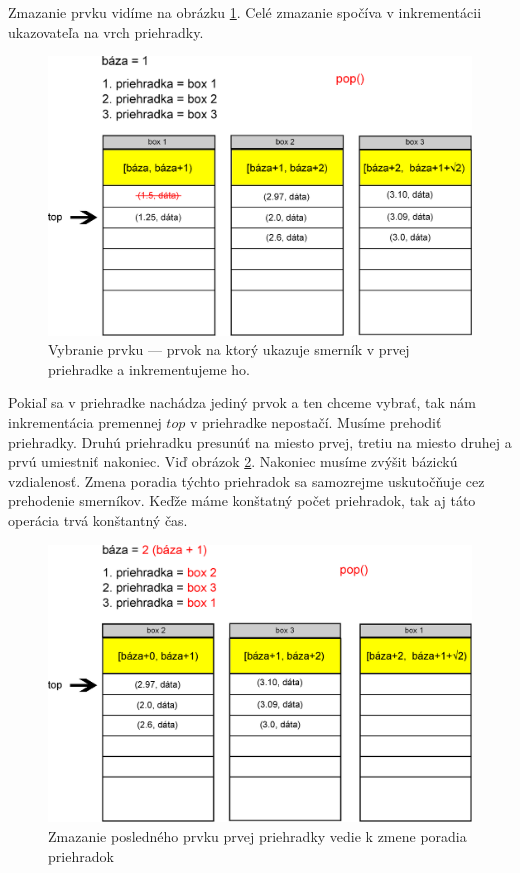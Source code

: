 Zmazanie prvku vidíme na obrázku \ref{fig:priehradky_i_d1}.
Celé zmazanie spočíva v inkrementácii ukazovateľa na vrch priehradky.

\begin{figure}[h]
\centering
\includegraphics[width=\textwidth]{./img/priehradky_naplnene_default_i_d1.eps}
\caption{Vybranie prvku --- prvok na ktorý ukazuje smerník v prvej priehradke a inkrementujeme ho.}
\label{fig:priehradky_i_d1}
\end{figure}


Pokiaľ sa v priehradke nachádza jediný prvok a ten chceme vybrať, tak nám inkrementácia premennej $ top $ v priehradke 
nepostačí. Musíme prehodiť priehradky. Druhú priehradku presunúť
na miesto prvej, tretiu na miesto druhej a prvú umiestniť nakoniec. Viď obrázok \ref{fig:priehradky_i_d2}. Nakoniec musíme zvýšit bázickú vzdialenosť. Zmena poradia týchto priehradok sa samozrejme uskutočňuje cez prehodenie smerníkov.
Keďže máme konštatný počet priehradok, tak aj táto operácia
trvá konštantný čas.

\begin{figure}[H]
\centering
\includegraphics[width=\textwidth]{./img/priehradky_naplnene_default_i_d2.eps}
\caption{Zmazanie posledného prvku prvej priehradky vedie k zmene poradia priehradok}
\label{fig:priehradky_i_d2}
\end{figure}


